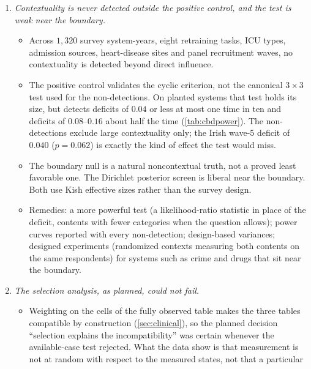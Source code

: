 \documentclass[11pt]{article}
\theoremstyle{definition}
\theoremstyle{remark}
\begin{document}
\begin{enumerate}[leftmargin=*]
\begin{itemize}[nosep]
  \item Three time points are too few. The latent Markov verdict flips between samples of the same population (PhysioNet sets A and B;
    UK and Irish wave 1--3). Two open cases remain: Diabetes 130, and the dense time series of MIMIC-IV.
  \end{itemize}
\item \emph{Contextuality is never detected outside the positive control, and the test is weak near the boundary.}
  \begin{itemize}[nosep]
  \item Across $1{,}320$ survey system-years, eight retraining tasks, ICU types, admission sources, heart-disease sites and panel recruitment
    waves, no contextuality is detected beyond direct influence.
  \item The positive control validates the cyclic criterion, not the canonical $3\times3$ test used for the non-detections. On planted
    systems that test holds its size, but detects deficits of $0.04$ or less at most one time in ten and deficits of $0.08$--$0.16$ about
    half the time (\cref{tab:cbdpower}). The non-detections exclude large contextuality only; the Irish wave-5 deficit of $0.040$
    ($p=0.062$) is exactly the kind of effect the test would miss.
  \item The boundary null is a natural noncontextual truth, not a proved least favorable one. The Dirichlet posterior screen is liberal near
    the boundary. Both use Kish effective sizes rather than the survey design.
  \item Remedies: a more powerful test (a likelihood-ratio statistic in place of the deficit, contents with fewer categories when the
    question allows); power curves reported with every non-detection; design-based variances; designed experiments (randomized contexts measuring both
    contents on the same respondents) for systems such as crime and drugs that sit near the boundary.
  \end{itemize}
\item \emph{The selection analysis, as planned, could not fail.}
  \begin{itemize}[nosep]
  \item Weighting on the cells of the fully observed table makes the three tables compatible by construction
    (\cref{sec:clinical}), so the planned decision ``selection explains the incompatibility'' was certain whenever the available-case
    test rejected. What the data show is that measurement is not at random with respect to the measured states, not that a particular

\end{itemize}
\end{enumerate}
\end{document}
